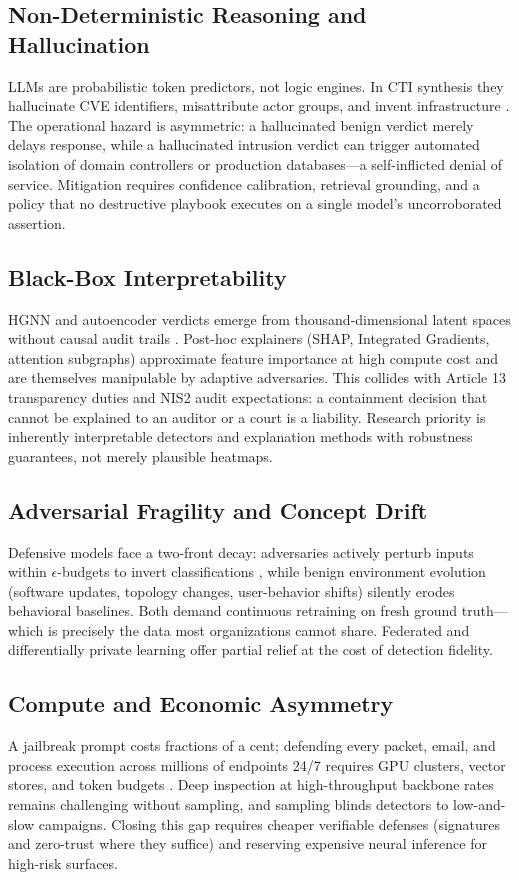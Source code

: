 \documentclass[conference,10pt,twocolumn,a4paper]{IEEEtran}
\begin{document}
\subsection{Non-Deterministic Reasoning and Hallucination}
LLMs are probabilistic token predictors, not logic engines. In CTI synthesis they hallucinate CVE identifiers, misattribute actor groups, and invent infrastructure \cite{owasp_llm_top10_2025, cisa_agentic_ai_2026}. The operational hazard is asymmetric: a hallucinated benign verdict merely delays response, while a hallucinated intrusion verdict can trigger automated isolation of domain controllers or production databases---a self-inflicted denial of service. Mitigation requires confidence calibration, retrieval grounding, and a policy that no destructive playbook executes on a single model's uncorroborated assertion.

\subsection{Black-Box Interpretability}
HGNN and autoencoder verdicts emerge from thousand-dimensional latent spaces without causal audit trails \cite{nist_sp_ai_100_2e2025, eu_ai_act_2024}. Post-hoc explainers (SHAP, Integrated Gradients, attention subgraphs) approximate feature importance at high compute cost and are themselves manipulable by adaptive adversaries. This collides with Article 13 transparency duties and NIS2 audit expectations: a containment decision that cannot be explained to an auditor or a court is a liability. Research priority is inherently interpretable detectors and explanation methods with robustness guarantees, not merely plausible heatmaps.

\subsection{Adversarial Fragility and Concept Drift}
Defensive models face a two-front decay: adversaries actively perturb inputs within $\epsilon$-budgets to invert classifications \cite{goodfellow2015explaining, mirsky2018kitsune}, while benign environment evolution (software updates, topology changes, user-behavior shifts) silently erodes behavioral baselines. Both demand continuous retraining on fresh ground truth---which is precisely the data most organizations cannot share. Federated and differentially private learning offer partial relief at the cost of detection fidelity.

\subsection{Compute and Economic Asymmetry}
A jailbreak prompt costs fractions of a cent; defending every packet, email, and process execution across millions of endpoints 24/7 requires GPU clusters, vector stores, and token budgets \cite{enisa_frontier_2026, crowdstrike_gtr_2025}. Deep inspection at high-throughput backbone rates remains challenging without sampling, and sampling blinds detectors to low-and-slow campaigns. Closing this gap requires cheaper verifiable defenses (signatures and zero-trust where they suffice) and reserving expensive neural inference for high-risk surfaces.
\end{document}
